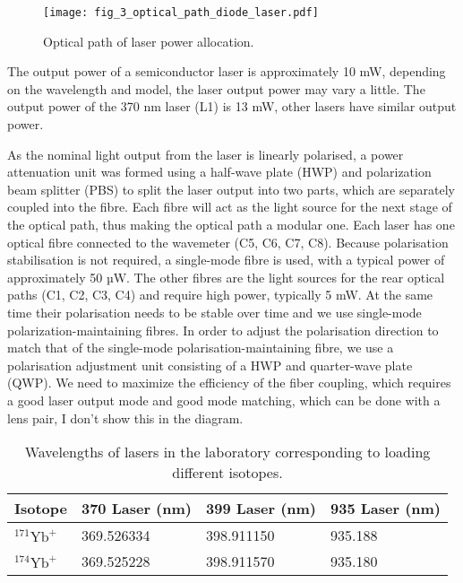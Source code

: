 \begin{figure}
    \centering
    \texttt{[image: fig\_3\_optical\_path\_diode\_laser.pdf]}
    \caption{Optical path of laser power allocation.}
    \label{fig:fig_3_optical_path_diode_laser}
\end{figure}

The output power of a semiconductor laser is approximately 10 mW, depending on the wavelength and model, the laser output power may vary a little. The output power of the 370 nm laser (L1) is 13 mW,
other lasers have similar output power.

As the nominal light output from the laser is linearly polarised, a power attenuation unit was formed using a half-wave plate (HWP) and polarization beam splitter (PBS) to split the laser output into two parts, which are separately coupled into the fibre. Each fibre will act as the light source for the next stage of the optical path, thus making the optical path a modular one. Each laser has one optical fibre connected to the wavemeter (C5, C6, C7, C8). Because polarisation stabilisation is not required, a single-mode fibre is used, with a typical power of approximately 50 µW. The other fibres are the light sources for the rear optical paths (C1, C2, C3, C4) and require high power, typically 5 mW. At the same time their polarisation needs to be stable over time and we use single-mode polarization-maintaining fibres. In order to adjust the polarisation direction to match that of the single-mode polarisation-maintaining fibre, we use a polarisation adjustment unit consisting of a HWP and quarter-wave plate (QWP). We need to maximize the efficiency of the fiber coupling, which requires a good laser output mode and good mode matching, which can be done with a lens pair, I don't show this in the diagram.

\begin{table}
    \centering
    \caption{Wavelengths of lasers in the laboratory corresponding to loading different isotopes.}
    \begin{tabular}{llll}
        \toprule
        Isotope                     & 370 Laser (nm) & 399 Laser (nm) & 935 Laser (nm) \\
        \midrule
        ${ }^{171} \mathrm{Yb}^{+}$ & 369.526334     & 398.911150     & 935.188        \\
        ${ }^{174} \mathrm{Yb}^{+}$ & 369.525228     & 398.911570     & 935.180        \\
        \bottomrule
    \end{tabular}
\end{table}


